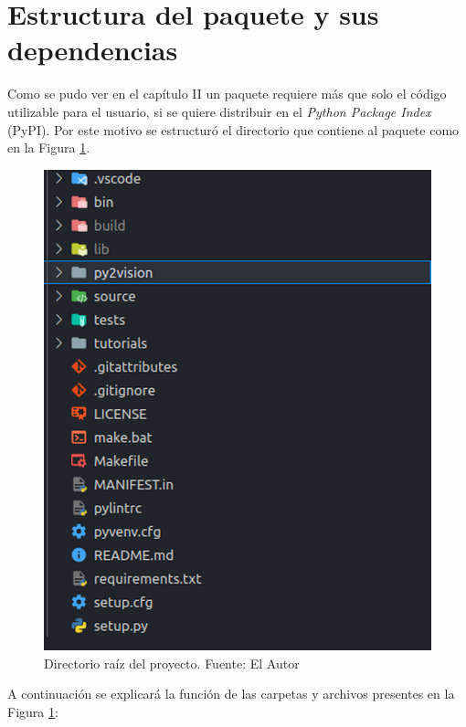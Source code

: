 \section{Estructura del paquete y sus dependencias}
Como se pudo ver en el capítulo II un paquete requiere más que solo el código utilizable para el usuario, si se quiere distribuir en el \textit{Python Package Index} (PyPI). Por este motivo se estructuró el directorio que contiene al paquete como en la Figura \ref{directorioCompletoPaquete}. 
\begin{figure}[H]
    \centering
    \includegraphics[scale=0.3]{Recursos/directoriosPaqueteNivelRoot.png}
    \caption[Directorio raíz del proyecto.]{Directorio raíz del proyecto. {\footnotesize Fuente: El Autor}}
    \label{directorioCompletoPaquete}
\end{figure}
A continuación se explicará la función de las carpetas y archivos presentes en la Figura \ref{directorioCompletoPaquete}:

